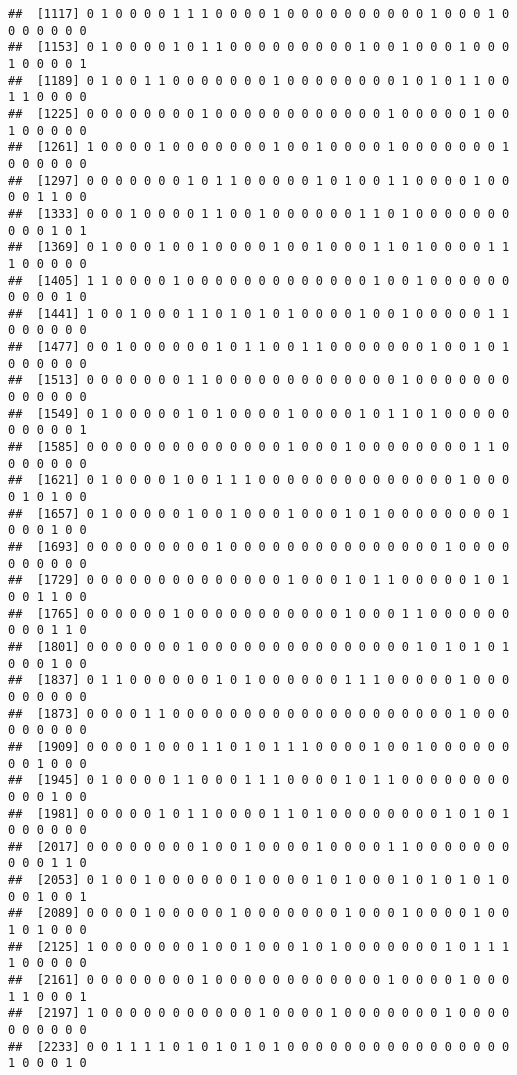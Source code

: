 \documentclass[
]{article}
\begin{document}
\begin{verbatim}
##  [1117] 0 1 0 0 0 0 1 1 1 0 0 0 0 1 0 0 0 0 0 0 0 0 0 0 1 0 0 0 1 0 0 0 0 0 0 0
##  [1153] 0 1 0 0 0 0 1 0 1 1 0 0 0 0 0 0 0 0 0 1 0 0 1 0 0 0 1 0 0 0 1 0 0 0 0 1
##  [1189] 0 1 0 0 1 1 0 0 0 0 0 0 0 1 0 0 0 0 0 0 0 0 1 0 1 0 1 1 0 0 1 1 0 0 0 0
##  [1225] 0 0 0 0 0 0 0 0 1 0 0 0 0 0 0 0 0 0 0 0 0 1 0 0 0 0 0 1 0 0 1 0 0 0 0 0
##  [1261] 1 0 0 0 0 1 0 0 0 0 0 0 0 1 0 0 1 0 0 0 0 1 0 0 0 0 0 0 0 1 0 0 0 0 0 0
##  [1297] 0 0 0 0 0 0 0 1 0 1 1 0 0 0 0 0 1 0 1 0 0 1 1 0 0 0 0 1 0 0 0 0 1 1 0 0
##  [1333] 0 0 0 1 0 0 0 0 1 1 0 0 1 0 0 0 0 0 0 1 1 0 1 0 0 0 0 0 0 0 0 0 0 1 0 1
##  [1369] 0 1 0 0 0 1 0 0 1 0 0 0 0 1 0 0 1 0 0 0 1 1 0 1 0 0 0 0 1 1 1 0 0 0 0 0
##  [1405] 1 1 0 0 0 0 1 0 0 0 0 0 0 0 0 0 0 0 0 0 1 0 0 1 0 0 0 0 0 0 0 0 0 0 1 0
##  [1441] 1 0 0 1 0 0 0 1 1 0 1 0 1 0 1 0 0 0 0 1 0 0 1 0 0 0 0 0 1 1 0 0 0 0 0 0
##  [1477] 0 0 1 0 0 0 0 0 0 1 0 1 1 0 0 1 1 0 0 0 0 0 0 0 1 0 0 1 0 1 0 0 0 0 0 0
##  [1513] 0 0 0 0 0 0 0 1 1 0 0 0 0 0 0 0 0 0 0 0 0 0 1 0 0 0 0 0 0 0 0 0 0 0 0 0
##  [1549] 0 1 0 0 0 0 0 1 0 1 0 0 0 0 1 0 0 0 0 1 0 1 1 0 1 0 0 0 0 0 0 0 0 0 0 1
##  [1585] 0 0 0 0 0 0 0 0 0 0 0 0 0 0 1 0 0 0 1 0 0 0 0 0 0 0 0 1 1 0 0 0 0 0 0 0
##  [1621] 0 1 0 0 0 0 1 0 0 1 1 1 0 0 0 0 0 0 0 0 0 0 0 0 0 0 1 0 0 0 0 1 0 1 0 0
##  [1657] 0 1 0 0 0 0 0 1 0 0 1 0 0 0 1 0 0 0 1 0 1 0 0 0 0 0 0 0 0 1 0 0 0 1 0 0
##  [1693] 0 0 0 0 0 0 0 0 0 1 0 0 0 0 0 0 0 0 0 0 0 0 0 0 0 1 0 0 0 0 0 0 0 0 0 0
##  [1729] 0 0 0 0 0 0 0 0 0 0 0 0 0 0 1 0 0 0 1 0 1 1 0 0 0 0 0 1 0 1 0 0 1 1 0 0
##  [1765] 0 0 0 0 0 0 1 0 0 0 0 0 0 0 0 0 0 0 1 0 0 0 1 1 0 0 0 0 0 0 0 0 0 1 1 0
##  [1801] 0 0 0 0 0 0 0 1 0 0 0 0 0 0 0 0 0 0 0 0 0 0 0 1 0 1 0 1 0 1 0 0 0 1 0 0
##  [1837] 0 1 1 0 0 0 0 0 0 1 0 1 0 0 0 0 0 0 1 1 1 0 0 0 0 0 1 0 0 0 0 0 0 0 0 0
##  [1873] 0 0 0 0 1 1 0 0 0 0 0 0 0 0 0 0 0 0 0 0 0 0 0 0 0 0 1 0 0 0 0 0 0 0 0 0
##  [1909] 0 0 0 0 1 0 0 0 1 1 0 1 0 1 1 1 0 0 0 0 1 0 0 1 0 0 0 0 0 0 0 0 1 0 0 0
##  [1945] 0 1 0 0 0 0 1 1 0 0 0 1 1 1 0 0 0 0 1 0 1 1 0 0 0 0 0 0 0 0 0 0 0 1 0 0
##  [1981] 0 0 0 0 0 1 0 1 1 0 0 0 0 1 1 0 1 0 0 0 0 0 0 0 0 1 0 1 0 1 0 0 0 0 0 0
##  [2017] 0 0 0 0 0 0 0 0 1 0 0 1 0 0 0 0 1 0 0 0 0 1 1 0 0 0 0 0 0 0 0 0 0 1 1 0
##  [2053] 0 1 0 0 1 0 0 0 0 0 0 1 0 0 0 0 1 0 1 0 0 0 1 0 1 0 1 0 1 0 0 0 1 0 0 1
##  [2089] 0 0 0 0 1 0 0 0 0 0 1 0 0 0 0 0 0 0 1 0 0 0 1 0 0 0 0 1 0 0 1 0 1 0 0 0
##  [2125] 1 0 0 0 0 0 0 0 1 0 0 1 0 0 0 1 0 1 0 0 0 0 0 0 0 1 0 1 1 1 1 0 0 0 0 0
##  [2161] 0 0 0 0 0 0 0 0 1 0 0 0 0 0 0 0 0 0 0 0 0 1 0 0 0 0 1 0 0 0 1 1 0 0 0 1
##  [2197] 1 0 0 0 0 0 0 0 0 0 0 0 1 0 0 0 0 1 0 0 0 0 0 0 0 1 0 0 0 0 0 0 0 0 0 0
##  [2233] 0 0 1 1 1 1 0 1 0 1 0 1 0 1 0 0 0 0 0 0 0 0 0 0 0 0 0 0 0 0 1 0 0 0 1 0

\end{verbatim}
\end{document}
